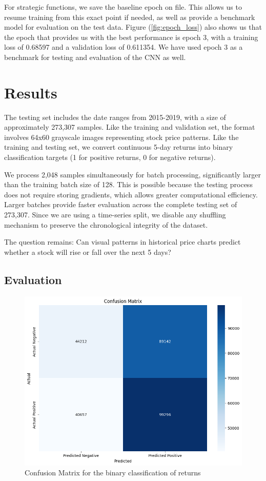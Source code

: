\documentclass[12pt]{article}
\begin{document}
For strategic functions, we save the baseline epoch on file. This allows us to resume training from this exact point if needed, as well as provide a benchmark model for evaluation on the test data. Figure (\ref{fig:epoch_loss}) also shows us that the epoch that provides us with the best performance is epoch 3, with a training loss of 0.68597 and a validation loss of 0.611354. We have used epoch 3 as a benchmark for testing and evaluation of the CNN as well.

\section*{Results}


The testing set includes the date ranges from 2015-2019, with a size of approximately 273,307 samples. Like the training and validation set, the format involves 64x60 grayscale images representing stock price patterns. Like the training and testing set, we convert continuous 5-day returns into binary classification targets (1 for positive returns, 0 for negative returns). 

We process 2,048 samples simultaneously for batch processing, significantly larger than the training batch size of 128. This is possible because the testing process does not require storing gradients, which allows greater computational efficiency. Larger batches provide faster evaluation across the complete testing set of 273,307. Since we are using a time-series split, we disable any shuffling mechanism to preserve the chronological integrity of the dataset.

The question remains: Can visual patterns in historical price charts predict whether a stock will rise or fall over the next 5 days?

\subsection*{Evaluation}

\begin{figure}[h]
	\centering
	\includegraphics[width=.85\linewidth]{plots/confusion_matrix.png}
	\caption{Confusion Matrix for the binary classification of returns}
	\label{fig:confusion_matrix}
\end{figure}
\end{document}
